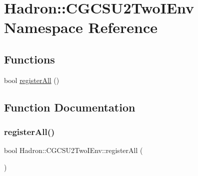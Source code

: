 \hypertarget{namespaceHadron_1_1CGCSU2TwoIEnv}{}\section{Hadron\+:\+:C\+G\+C\+S\+U2\+Two\+I\+Env Namespace Reference}
\label{namespaceHadron_1_1CGCSU2TwoIEnv}
\subsection*{Functions}
\begin{DoxyCompactItemize}
\item 
bool \mbox{\hyperlink{namespaceHadron_1_1CGCSU2TwoIEnv_aed4e8b3bb2141bf8176b9a6be35b2406}{register\+All}} ()
\end{DoxyCompactItemize}


\subsection{Function Documentation}
\mbox{\label{namespaceHadron_1_1CGCSU2TwoIEnv_aed4e8b3bb2141bf8176b9a6be35b2406}} 
\subsubsection{\texorpdfstring{registerAll()}{registerAll()}}
{\footnotesize\ttfamily bool Hadron\+::\+C\+G\+C\+S\+U2\+Two\+I\+Env\+::register\+All (\begin{DoxyParamCaption}{ }\end{DoxyParamCaption})}

